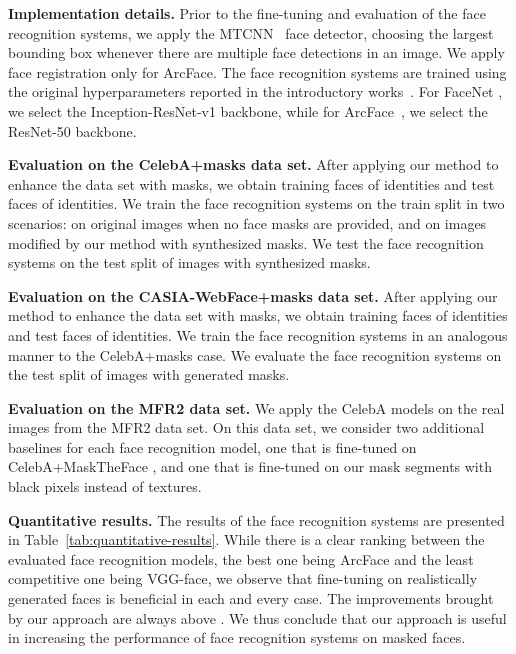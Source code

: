 \documentclass{article}
\begin{document}
{\bf Implementation details.} Prior to the fine-tuning and evaluation of the face recognition systems, we apply the MTCNN~\cite{zhang2016spl} face detector, choosing the largest bounding box whenever there are multiple face detections in an image. We apply face registration only for ArcFace. The face recognition systems are trained using the original hyperparameters reported in the introductory works~\cite{Schroff15CVPR,Deng19CVPR,Parkhi15BMVC}. For FaceNet \cite{Schroff15CVPR}, we select the Inception-ResNet-v1 backbone, while for ArcFace~\cite{Deng19CVPR}, we select the ResNet-50 backbone.



{\bf Evaluation on the CelebA+masks data set.} After applying our method to enhance the data set with masks, we obtain  training faces of  identities and  test faces of  identities. We train the face recognition systems on the train split in two scenarios: on original images when no face masks are provided, and on images modified by our method with synthesized masks. We test the face recognition systems on the test split of images with synthesized masks.

{\bf Evaluation on the CASIA-WebFace+masks data set.} After applying our method to enhance the data set with masks, we obtain  training faces of  identities and  test faces of  identities. We train the face recognition systems in an analogous manner to the CelebA+masks case. We evaluate the face recognition systems on the test split of images with generated masks.

{\bf Evaluation on the MFR2 data set.}
We apply the CelebA models on the real images from the MFR2 \cite{anwar2020arxiv} data set. On this data set, we consider two additional baselines for each face recognition model, one that is fine-tuned on CelebA+MaskTheFace \cite{anwar2020arxiv}, and one that is fine-tuned on our mask segments with black pixels instead of textures.

{\bf Quantitative results.} 
The results of the face recognition systems are presented in Table~\ref{tab:quantitative-results}. While there is a clear ranking between the evaluated face recognition models, the best one being ArcFace and the least competitive one being VGG-face, we observe that fine-tuning on realistically generated faces is beneficial in each and every case. The improvements brought by our approach are always above . We thus conclude that our approach is useful in increasing the performance of face recognition systems on masked faces.
\end{document}
